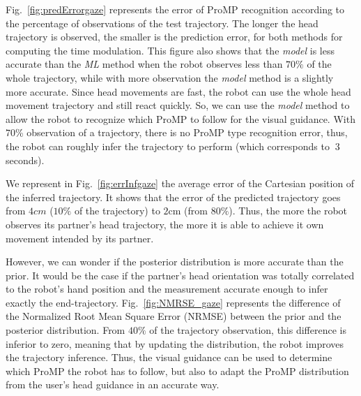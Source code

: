 \documentclass[runningheads,a4paper]{llncs}
\begin{document}
Fig.~\ref{fig:predErrorgaze} represents the error of ProMP recognition according to the percentage of observations of the test trajectory. 
The longer the head trajectory is observed, the smaller is the prediction error, for both methods for computing the time modulation. 
This figure also shows that the \textit{model} is less accurate than the \textit{ML} method when the robot observes less than $70\%$ of the whole trajectory, while with more observation the \textit{model} method is a slightly more accurate. Since head movements are fast, the robot can use the whole head movement trajectory and still react quickly. So, we can use the \textit{model} method to allow the robot to recognize which ProMP to follow for the visual guidance. With $70$\% observation of a trajectory, there is no ProMP type recognition error, thus, the robot can roughly infer the trajectory to perform (which corresponds to $~3$ seconds).   

We represent in Fig.~\ref{fig:errInfgaze} the average error of the Cartesian position of the inferred trajectory. It shows that the error of the predicted trajectory goes from $4cm$ ($10\%$ of the trajectory) to $2$cm (from $80\%$). Thus, the more the robot observes its partner's head trajectory, the more it is able to achieve it own movement intended by its partner.

However, we can wonder if the posterior distribution is more accurate than the prior. It would be the case if the partner's head orientation was totally correlated to the robot's hand position and the measurement accurate enough to infer exactly the end-trajectory. Fig.~\ref{fig:NMRSE_gaze} represents the difference of the Normalized Root Mean Square Error (NRMSE) between the prior and the posterior distribution. From $40\%$ of the trajectory observation, this difference is inferior to zero, meaning that by updating the distribution, the robot improves the trajectory inference. Thus, the visual guidance can be used to determine which ProMP the robot has to follow, but also to adapt the ProMP distribution from the user's head guidance in an accurate way.
\end{document}
